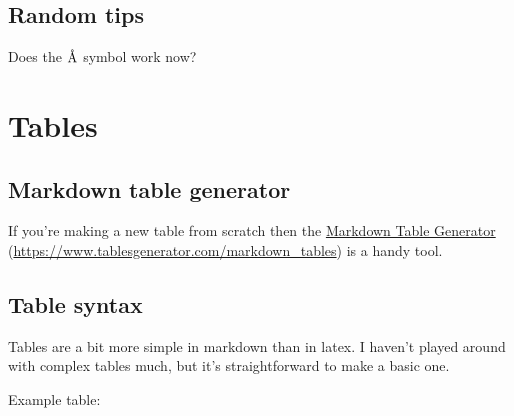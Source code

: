 \documentclass[
]{book}
\newcommand{\angstrom}{\mbox{\normalfont\AA}}
\begin{document}
\section{Random tips}\label{sec:random-tips}

Does the \(\angstrom\) symbol work now?

\chapter{Tables}\label{sec:tables}

\section{Markdown table generator}\label{sec:md-tab-gen}

If you're making a new table from scratch then the \hyperref[sec:md-tab-gen]{Markdown Table Generator} (\url{https://www.tablesgenerator.com/markdown_tables}) is a handy tool.

\section{Table syntax}\label{sec:tab-syntax}

Tables are a bit more simple in markdown than in latex. I haven't played around with complex tables much, but it's straightforward to make a basic one.

Example table:
\end{document}
